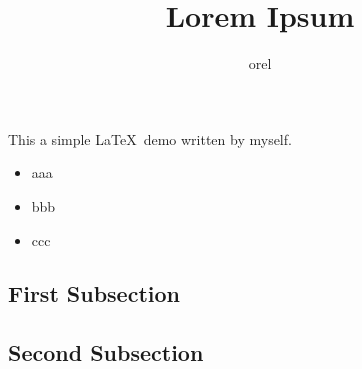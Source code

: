 \documentclass[12pt]{article}
\author{orel}
\title{Lorem Ipsum}
\begin{document}
\maketitle

\noindent This a simple \LaTeX\ demo written by myself.

\begin{itemize}
	\item aaa
	\item bbb
	\item ccc
\end{itemize}

\subsection*{First Subsection}

\lipsum[1]

\subsection*{Second Subsection}

\lipsum[2]
\end{document}

